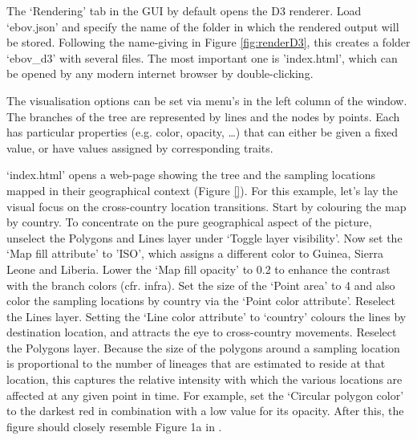 \documentclass[english]{paper}
\begin{document}
The `Rendering' tab in the GUI by default opens the D3 renderer.
Load `ebov.json' and specify the name of the folder in which the rendered output will be stored. %
Following the name-giving in Figure \ref{fig:renderD3}, this creates a folder `ebov\_d3' with several files.
The most important one is 'index.html', which can be opened by any modern internet browser by double-clicking. 
\par
The visualisation options can be set via menu's in the left column of the window.
The branches of the tree are represented by lines and the nodes by points. %
Each has particular properties (e.g. color, opacity, \dots) that can either be given a fixed value, or have values assigned by corresponding traits.
\par
`index.html' opens a web-page showing the tree and the sampling locations mapped in their geographical context (Figure \ref{}). 
For this example, let's lay the visual focus on the cross-country location transitions.
Start by colouring the map by country. 
To concentrate on the pure geographical aspect of the picture, unselect the Polygons and Lines layer under `Toggle layer visibility'.
Now set the `Map fill attribute' to 'ISO', which assigns a different color to Guinea, Sierra Leone and Liberia.
Lower the `Map fill opacity' to 0.2 to enhance the contrast with the branch colors (cfr. infra).
Set the size of the `Point area' to 4 and also color the sampling locations by country via the `Point color attribute'.
Reselect the Lines layer.
Setting the `Line color attribute' to `country' colours the lines by destination location, and attracts the eye to cross-country movements.
Reselect the Polygons layer.
Because the size of the polygons around a sampling location is proportional to the number of lineages that are estimated to reside at that location, this captures the relative intensity with which the various locations are affected at any given point in time.
For example, set the `Circular polygon color'  to the darkest red in combination with a low value for its opacity. 
After this, the figure should closely resemble Figure 1a in \cite{Bielejec:2016aa}.
\end{document}
